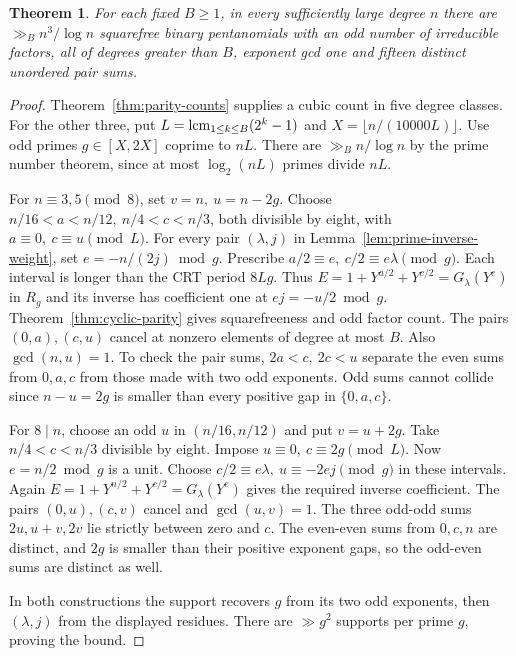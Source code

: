 \documentclass[11pt]{article}
\newtheorem{theorem}{Theorem}
\begin{document}
\begin{theorem}\label{thm:prime-gap-density}
For each fixed \(B\ge1\), in every sufficiently large degree \(n\)
there are \(\gg_B n^3/\log n\) squarefree binary pentanomials
with an odd number of irreducible factors, all of degrees greater
than \(B\), exponent gcd one and fifteen distinct unordered pair sums.
\end{theorem}
\begin{proof}
Theorem~\ref{thm:parity-counts} supplies a cubic count in five
degree classes. For the other three, put
\(L=\mathop{\rm lcm}_{1\le k\le B}(2^k-1)\) and \(X=\lfloor n/(10000L)\rfloor\).
Use odd primes \(g\in[X,2X]\) coprime to \(nL\). There are
\(\gg_B n/\log n\) by the prime number theorem, since at most
\(\log_2(nL)\) primes divide \(nL\).

For \(n\equiv3,5\pmod8\), set \(v=n,\ u=n-2g\). Choose
\(n/16<a<n/12,\ n/4<c<n/3\), both divisible by eight, with
\(a\equiv0,\ c\equiv u\pmod L\). For every pair \((\lambda,j)\)
in Lemma~\ref{lem:prime-inverse-weight}, set
\(e=-n/(2j)\bmod g\). Prescribe
\(a/2\equiv e,\ c/2\equiv e\lambda\pmod g\).
Each interval is longer than the CRT period \(8Lg\). Thus
\(E=1+Y^{a/2}+Y^{c/2}=G_\lambda(Y^e)\) in \(R_g\) and its
inverse has coefficient one at \(ej=-u/2\bmod g\). Theorem~\ref{thm:cyclic-parity}
gives squarefreeness and odd factor count. The pairs \((0,a),(c,u)\)
cancel at nonzero elements of degree at most \(B\). Also
\(\gcd(n,u)=1\). To check the pair sums, \(2a<c,\ 2c<u\)
separate the even sums from \(0,a,c\) from those made with two
odd exponents. Odd sums cannot collide since \(n-u=2g\) is smaller
than every positive gap in \(\{0,a,c\}\).

For \(8\mid n\), choose an odd \(u\) in \((n/16,n/12)\) and put
\(v=u+2g\). Take \(n/4<c<n/3\) divisible by eight. Impose
\(u\equiv0,\ c\equiv2g\pmod L\). Now \(e=n/2\bmod g\) is a unit.
Choose \(c/2\equiv e\lambda,\ u\equiv-2ej\pmod g\) in these
intervals. Again \(E=1+Y^{n/2}+Y^{c/2}=G_\lambda(Y^e)\) gives the
required inverse coefficient. The pairs \((0,u),(c,v)\) cancel and
\(\gcd(u,v)=1\). The three odd-odd sums \(2u,u+v,2v\) lie strictly
between zero and \(c\). The even-even sums from \(0,c,n\) are distinct,
and \(2g\) is smaller than their positive exponent gaps, so the
odd-even sums are distinct as well.

In both constructions the support recovers \(g\) from its two odd
exponents, then \((\lambda,j)\) from the displayed residues. There
are \(\gg g^2\) supports per prime \(g\), proving the bound.
\end{proof}
\end{document}
